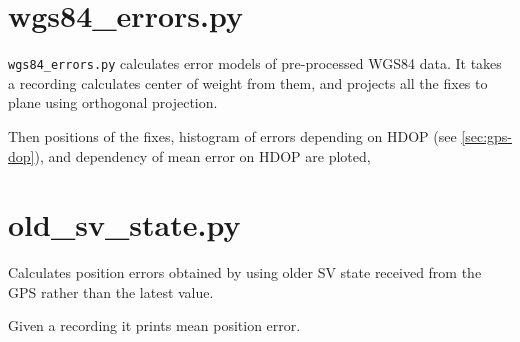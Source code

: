 \section{wgs84\_errors.py}



\verb=wgs84_errors.py= calculates error models of pre-processed WGS84 data.
It takes a recording calculates center of weight from them, and projects all the fixes to plane
using orthogonal projection.

Then positions of the fixes, histogram of errors depending on HDOP (see
\ref{sec:gps-dop}), and dependency of mean error on HDOP are ploted, 

\section{old\_sv\_state.py}



Calculates position errors obtained by using older SV state received from
the GPS rather than the latest value.

Given a recording it prints mean position error.
